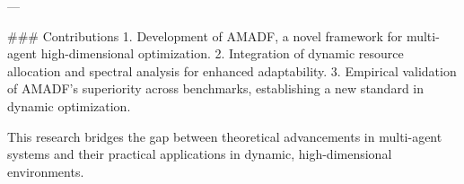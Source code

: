 ---

### Contributions  
1. Development of AMADF, a novel framework for multi-agent high-dimensional optimization.  
2. Integration of dynamic resource allocation and spectral analysis for enhanced adaptability.  
3. Empirical validation of AMADF's superiority across benchmarks, establishing a new standard in dynamic optimization.  

This research bridges the gap between theoretical advancements in multi-agent systems and their practical applications in dynamic, high-dimensional environments.  